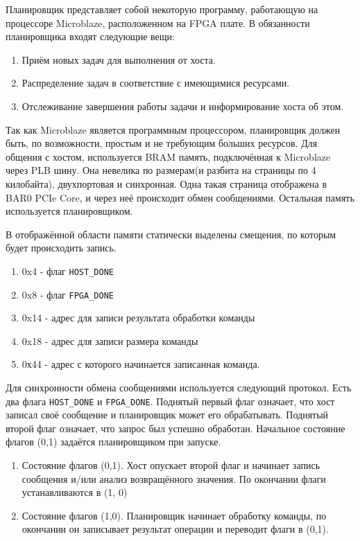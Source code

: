 Планировщик представляет собой некоторую программу, работающую на процессоре
Microblaze, расположенном на FPGA плате. 
В обязанности планировщика входят следующие вещи:
\begin{enumerate}
  \item Приём новых задач для выполнения от хоста.
  \item Распределение задач в соответствие с имеющимися ресурсами.
  \item Отслеживание завершения работы задачи и информирование хоста об этом.
\end{enumerate}

Так как Microblaze является программным процессором, планировщик должен быть,
по возможности, простым и не требующим больших ресурсов.
Для общения с хостом, используется BRAM память, подключённая к Microblaze через
PLB шину. Она невелика по размерам(и разбита на страницы по 4 килобайта),
двухпортовая и синхронная. Одна такая страница отображена в BAR0 PCIe Core,
и через неё происходит обмен сообщениями. Остальная память используется
планировщиком.

В отображённой области памяти статически выделены смещения, по которым будет
происходить запись.
\begin{enumerate}
  \item 0x4 - флаг \texttt {HOST\_DONE}
  \item 0x8 - флаг \texttt {FPGA\_DONE}
  \item 0x14 - адрес для записи результата обработки команды
  \item 0x18 - адрес для записи размера команды
  \item 0х44 - адрес с которого начинается записанная команда.
\end{enumerate}

Для синхронности обмена сообщениями используется следующий протокол.  Есть два
флага \texttt {HOST\_DONE} и \texttt {FPGA\_DONE}. Поднятый первый флаг
означает, что хост записал своё сообщение и планировщик может его обрабатывать.
Поднятый второй флаг означает, что запрос был успешно обработан. 
Начальное состояние флагов (0,1) задаётся планировщиком при запуске. 
\begin{enumerate}
  \item Состояние флагов (0,1). Хост опускает второй флаг и начинает запись
  сообщения и/или анализ возвращённого значения. По окончании флаги
  устанавливаются в (1, 0)
  \item Состояние флагов (1,0). Планировщик начинает обработку команды, по
  окончании он записывает результат операции и переводит флаги в (0,1).
\end{enumerate}

